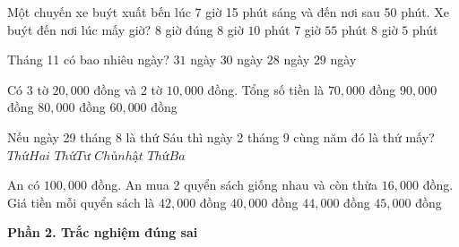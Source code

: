 \begin{ex} %
Một chuyến xe buýt xuất bến lúc 7 giờ 15 phút sáng và đến nơi sau 50 phút. Xe buýt đến nơi lúc mấy giờ?
\choice
{$8$ giờ đúng}
{$8$ giờ $10$ phút}
{$7$ giờ $55$ phút}
{\True $8$ giờ $5$ phút}
\end{ex}

\begin{ex} %
Tháng 11 có bao nhiêu ngày?
\choice
{$31$ ngày}
{\True $30$ ngày}
{$28$ ngày}
{$29$ ngày}
\end{ex}

\begin{ex} %
Có 3 tờ $20,000$ đồng và 2 tờ $10,000$ đồng. Tổng số tiền là
\choice
{$70,000$ đồng}
{$90,000$ đồng}
{\True $80,000$ đồng}
{$60,000$ đồng}
\end{ex}

\begin{ex} %
Nếu ngày 29 tháng 8 là thứ Sáu thì ngày 2 tháng 9 cùng năm đó là thứ mấy?
\choice
{$Thứ Hai$}
{$Thứ Tư$}
{$Chủ nhật$}
{\True $Thứ Ba$}
\end{ex}

\begin{ex} %
An có $100,000$ đồng. An mua 2 quyển sách giống nhau và còn thừa $16,000$ đồng. Giá tiền mỗi quyển sách là
\choice
{\True $42,000$ đồng}
{$40,000$ đồng}
{$44,000$ đồng}
{$45,000$ đồng}
\end{ex}

\textbf{Phần 2. Trắc nghiệm đúng sai}

